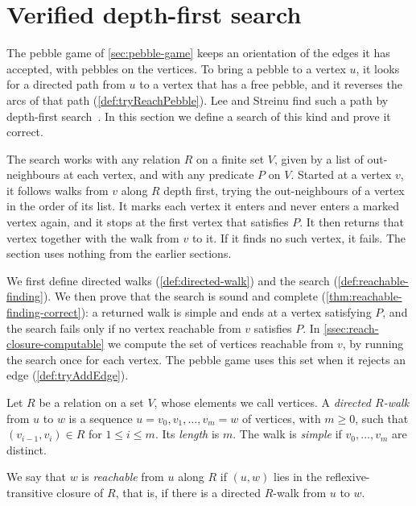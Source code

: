 \section{Verified depth-first search}
\label{sec:dfs}

The pebble game of \cref{sec:pebble-game} keeps an orientation of the
edges it has accepted, with pebbles on the vertices. To bring a pebble
to a vertex $u$, it looks for a directed path from $u$ to a vertex
that has a free pebble, and it reverses the arcs of that path
(\cref{def:tryReachPebble}). Lee and Streinu find such a path by
depth-first search~\cite[\S 3]{leeStreinu2008}. In this section we
define a search of this kind and prove it correct.

The search works with any relation $R$ on a finite set $V$, given by a
list of out-neighbours at each vertex, and with any predicate $P$ on
$V$. Started at a vertex $v$, it follows walks from $v$ along $R$
depth first, trying the out-neighbours of a vertex in the order of
its list. It marks each vertex it enters and never enters a marked
vertex again, and it stops at the first vertex that satisfies $P$.
It then returns that vertex together with the walk from $v$ to it. If
it finds no such vertex, it fails. The section uses nothing from the earlier
sections.

We first define directed walks (\cref{def:directed-walk}) and the
search (\cref{def:reachable-finding}). We then prove that the search
is sound and complete (\cref{thm:reachable-finding-correct}): a
returned walk is simple and ends at a vertex satisfying $P$, and the
search fails only if no vertex reachable from $v$ satisfies $P$. In
\cref{ssec:reach-closure-computable} we compute the set of vertices
reachable from $v$, by running the search once for each vertex. The
pebble game uses this set when it rejects an edge
(\cref{def:tryAddEdge}).

\begin{definition}
  \label{def:directed-walk}
  \leanok
  Let $R$ be a relation on a set $V$, whose elements we call vertices.
  A \emph{directed $R$-walk} from $u$ to $w$ is a sequence
  $u = v_0, v_1, \ldots, v_m = w$ of vertices, with $m \ge 0$, such
  that $(v_{i-1}, v_i) \in R$ for $1 \le i \le m$. Its \emph{length}
  is $m$. The walk is \emph{simple} if $v_0, \ldots, v_m$ are
  distinct.
\end{definition}

We say that $w$ is \emph{reachable} from $u$ along $R$ if $(u, w)$
lies in the reflexive-transitive closure of $R$, that is, if there is
a directed $R$-walk from $u$ to $w$.

